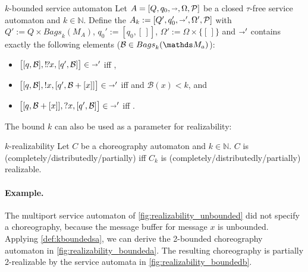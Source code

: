 \begin{definition}{\boldmath$k$-bounded service automaton}\label{def:kboundedsa}%
Let $A=[Q,q_{0},{\shortrightarrow},\Omega,\mathcal{P}]$ be a closed $\tau$-free service automaton and $k\in\mathds{N}$. Define the  $A_{k}:=[Q',q_{0}',{\shortrightarrow}',\Omega',\mathcal{P}]$ with $Q':=Q\times\mathit{Bags}_{k}(M_{A})$, $q_{0}':=[q_{0},[\,]]$, $\Omega':=\Omega\times\{[\,]\}$ and ${\shortrightarrow}'$ contains exactly the following elements ($\mathcal{B}\in\Bags_{k}(\M_{a})$):
\begin{itemize}
\item $\bigl[[q,\mathcal{B}],!\!\textsl{?} x,[q',\mathcal{B}]\bigr]\in{\shortrightarrow}'$ iff ,
\item $\bigl[[q,\mathcal{B}],!x,[q',\mathcal{B}+[x]]\bigr]\in{\shortrightarrow}'$ iff  and $\mathcal{B}(x)<k$, and
\item $\bigl[[q,\mathcal{B}+[x]],?x,[q',\mathcal{B}]\bigr]\in{\shortrightarrow}'$ iff .
\end{itemize}
\end{definition}

The bound $k$ can also be used as a parameter for realizability:

\begin{definition}{\boldmath$k$-realizability}
Let $C$ be a choreography automaton and $k\in\mathds{N}$. $C$ is (completely/distributedly/partially)  iff $C_{k}$ is (completely/distributedly/partially) realizable.
\end{definition}


\paragraph{Example.}

The multiport service automaton of \autoref{fig:realizability_unbounded} did not specify a choreography, because the message buffer for message $x$ is unbounded. Applying \autoref{def:kboundedsa}, we can derive the 2-bounded choreography automaton in \autoref{fig:realizability_boundeda}. The resulting choreography is partially 2-realizable by the service automata in \autoref{fig:realizability_boundedb}.

